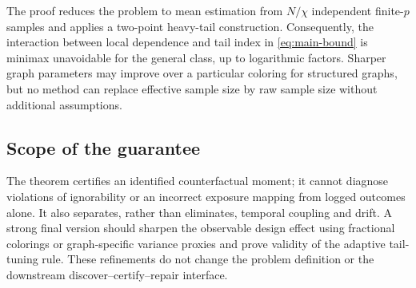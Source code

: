 The proof reduces the problem to mean estimation from $N/\chi$ independent finite-$p$ samples and applies a two-point heavy-tail construction. Consequently, the interaction between local dependence and tail index in \cref{eq:main-bound} is minimax unavoidable for the general class, up to logarithmic factors. Sharper graph parameters may improve over a particular coloring for structured graphs, but no method can replace effective sample size by raw sample size without additional assumptions.

\subsection{Scope of the guarantee}
The theorem certifies an identified counterfactual moment; it cannot diagnose violations of ignorability or an incorrect exposure mapping from logged outcomes alone. It also separates, rather than eliminates, temporal coupling and drift. A strong final version should sharpen the observable design effect using fractional colorings or graph-specific variance proxies and prove validity of the adaptive tail-tuning rule. These refinements do not change the problem definition or the downstream discover--certify--repair interface.
